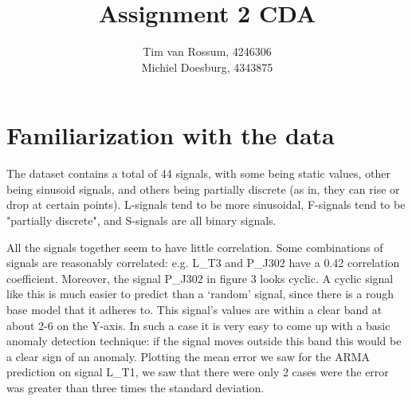 \documentclass[]{article}
\title{Assignment 2 CDA}
\author{Tim van Rossum, 4246306\\
	Michiel Doesburg, 4343875}
\begin{document}
\maketitle
\section{Familiarization with the data}
The dataset contains a total of 44 signals, with some being static values, other being sinusoid signals, and others being partially discrete (as in, they can rise or drop at certain points). L-signals tend to be more sinusoidal, F-signals tend to be "partially discrete", and S-signals are all binary signals.

All the signals together seem to have little correlation. Some combinations of signals are reasonably correlated: e.g. L\_T3 and P\_J302 have a 0.42 correlation coefficient. Moreover, the signal P\_J302 in figure 3 looks cyclic. A cyclic signal like this is much easier to predict than a `random' signal, since there is a rough base model that it adheres to. This signal's values are within a clear band at about 2-6 on the Y-axis. In such a case it is very easy to come up with a basic anomaly detection technique: if the signal moves outside this band this would be a clear sign of an anomaly. Plotting the mean error we saw for the ARMA prediction on signal L\_T1, we saw that there were only 2 cases were the error was greater than three times the standard deviation. 
\end{document}
